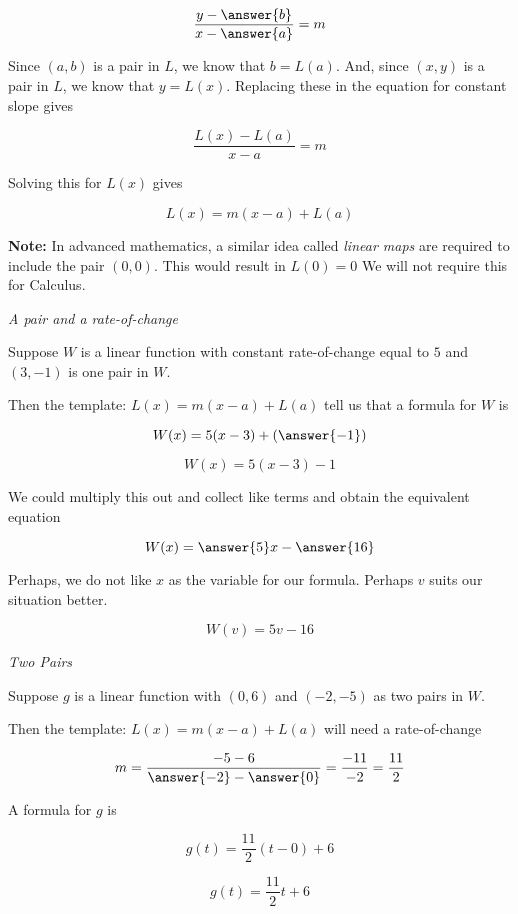 \documentclass{ximera}
\begin{document}
\[  \frac{y - \answer{b}}{x-\answer{a}} = m \]

Since $(a, b)$ is a pair in $L$, we know that $b = L(a)$.  And, since $(x, y)$ is a pair in $L$, we know that $y = L(x)$.  Replacing these in the equation for constant slope gives


\[  \frac{L(x) - L(a)}{x-a} = m \]

Solving this for $L(x)$ gives

\[  L(x) = m (x-a) + L(a)     \]



\textbf{Note:} In advanced mathematics, a similar idea called \textit{linear maps} are required to include the pair $(0,0)$.  This would result in $L(0) = 0$  We will not require this for Calculus.




\begin{example} \textit{A pair and a rate-of-change}


Suppose $W$ is a linear function with constant rate-of-change equal to $5$ and $(3, -1)$ is one pair in $W$.

Then the template: $L(x) = m (x-a) + L(a)$ tell us that a formula for $W$ is 


\[  W(x) = 5 (x-3) + \left(\answer{-1}\right)     \]


\[  W(x) = 5 (x-3) - 1     \]

We could multiply this out and collect like terms and obtain the equivalent equation


\[  W(x) = \answer{5}x - \answer{16}   \]


Perhaps, we do not like $x$ as the variable for our formula.  Perhaps $v$ suits our situation better.

\[  W(v) = 5v - 16   \]

\end{example}









\begin{example} \textit{Two Pairs}


Suppose $g$ is a linear function with $(0, 6)$ and $(-2, -5)$ as two pairs in $W$.

Then the template: $L(x) = m (x-a) + L(a)$ will need a rate-of-change



\[  m = \frac{-5 - 6}{\answer{-2} - \answer{0}} = \frac{-11}{-2} = \frac{11}{2}  \]

A formula for $g$ is


\[  g(t) = \frac{11}{2} (t-0) + 6     \]


\[  g(t) = \frac{11}{2} t + 6    \]



\end{example}
\end{document}
